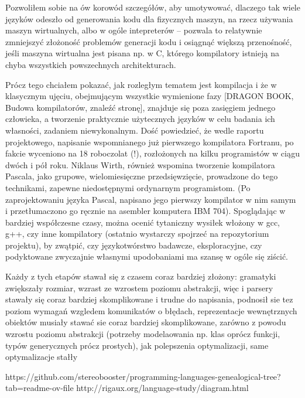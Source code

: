 Pozwoliłem sobie na ów korowód szczegółów, aby umotywować, dlaczego tak wiele języków odeszło od generowania kodu dla fizycznych maszyn, na rzecz używania maszyn wirtualnych, albo w ogóle intepreterów – pozwala to relatywnie zmniejszyć złożoność problemów generacji kodu i osiągnąć większą przenośność, jeśli maszyna wirtualna jest pisana np. w C, którego kompilatory istnieją na chyba wszystkich powszechnych architekturach.

Prócz tego chciałem pokazać, jak rozległym tematem jest kompilacja i że w klasycznym ujęciu, obejmującym wszystkie wymienione fazy [DRAGON BOOK, Budowa kompilatorów, znaleźć stronę], znajduje się poza zasięgiem jednego człowieka, a tworzenie praktycznie użytecznych języków w celu badania ich własności, zadaniem niewykonalnym. Dość powiedzieć, że wedle raportu projektowego, napisanie wspomnianego już pierwszego kompilatora Fortranu, po fakcie wyceniono na 18 roboczolat (!), rozłożonych na kilku programistów w ciągu dwóch i pół roku.
Niklaus Wirth, również wspomina tworzenie kompilatora Pascala, jako grupowe, wielomiesięczne przedsięwzięcie, prowadzone do tego technikami, zapewne niedostępnymi ordynarnym programistom. (Po zaprojektowaniu języka Pascal, napisano jego pierwszy kompilator w nim samym i przetłumaczono go ręcznie na asembler komputera IBM 704). Spoglądając w bardziej współczesne czasy, można ocenić tytaniczny wysiłek włożony w gcc, g++, czy inne kompilatory (ostatnio wystarczy spojrzeć na repozytorium projektu), by zwątpić, czy językotwórstwo badawcze, eksploracyjne, czy podyktowane zwyczajnie własnymi upodobaniami ma szansę w ogóle się ziścić.


Każdy z tych etapów stawał się z czasem coraz bardziej złożony:
gramatyki zwiększały rozmiar, wzrast ze wzrostem poziomu abstrakcji, więc i parsery stawały się coraz bardziej skomplikowane i trudne do napisania, podnosił sie tez poziom wymagań wzgledem komunikatów o błędach,
reprezentacje wewnętrznych obiektów musiały stawać sie coraz bardziej skomplikowane, zarówno z powodu wzrostu poziomu abstrakcji (potrzeby modelaowania np. klas oprócz funkcji, typów generycznych prócz prostych), jak polepszenia optymalizacji, same optymalizacje stałły 


https://github.com/stereobooster/programming-languages-genealogical-tree?tab=readme-ov-file
http://rigaux.org/language-study/diagram.html

